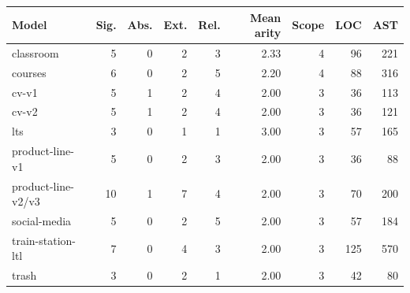\begin{tabular}{@{}lrrrrrrrr@{}}
\toprule
Model & Sig. & Abs. & Ext. & Rel. & Mean arity & Scope & LOC & AST\\
\midrule
classroom & 5 & 0 & 2 & 3 & 2.33 & 4 & 96 & 221\\
courses & 6 & 0 & 2 & 5 & 2.20 & 4 & 88 & 316\\
cv-v1 & 5 & 1 & 2 & 4 & 2.00 & 3 & 36 & 113\\
cv-v2 & 5 & 1 & 2 & 4 & 2.00 & 3 & 36 & 121\\
lts & 3 & 0 & 1 & 1 & 3.00 & 3 & 57 & 165\\
product-line-v1 & 5 & 0 & 2 & 3 & 2.00 & 3 & 36 & 88\\
product-line-v2/v3 & 10 & 1 & 7 & 4 & 2.00 & 3 & 70 & 200\\
social-media & 5 & 0 & 2 & 5 & 2.00 & 3 & 57 & 184\\
train-station-ltl & 7 & 0 & 4 & 3 & 2.00 & 3 & 125 & 570\\
trash & 3 & 0 & 2 & 1 & 2.00 & 3 & 42 & 80\\
\bottomrule
\end{tabular}
